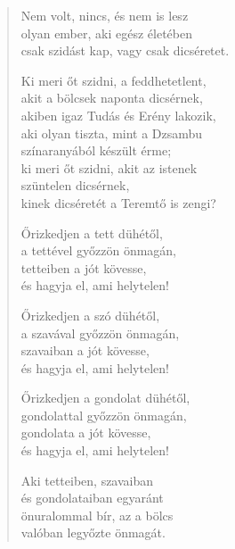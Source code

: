 \begin{verse}
 Nem volt, nincs, és nem is lesz\\
olyan ember, aki egész életében\\
csak szidást kap, vagy csak dicséretet.

 Ki meri őt szidni, a feddhetetlent,\\
akit a bölcsek naponta dicsérnek,\\
akiben igaz Tudás és Erény lakozik,\\
aki olyan tiszta, mint a Dzsambu\\
színaranyából készült érme;\\
ki meri őt szidni, akit az istenek\\
szüntelen dicsérnek,\\
kinek dicséretét a Teremtő is zengi?

 Őrizkedjen a tett dühétől,\\
a tettével győzzön önmagán,\\
tetteiben a jót kövesse,\\
és hagyja el, ami helytelen!

 Őrizkedjen a szó dühétől,\\
a szavával győzzön önmagán,\\
szavaiban a jót kövesse,\\
és hagyja el, ami helytelen!

 Őrizkedjen a gondolat dühétől,\\
gondolattal győzzön önmagán,\\
gondolata a jót kövesse,\\
és hagyja el, ami helytelen!

 Aki tetteiben, szavaiban\\
és gondolataiban egyaránt\\
önuralommal bír, az a bölcs\\
valóban legyőzte önmagát.

\end{verse}
